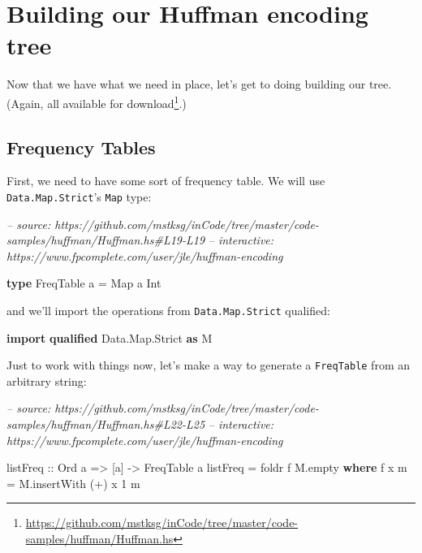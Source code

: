 \documentclass[]{article}
\newenvironment{Shaded}{}{}
\newcommand{\CommentTok}[1]{\textcolor[rgb]{0.38,0.63,0.69}{\textit{#1}}}
\newcommand{\DataTypeTok}[1]{\textcolor[rgb]{0.56,0.13,0.00}{#1}}
\newcommand{\DecValTok}[1]{\textcolor[rgb]{0.25,0.63,0.44}{#1}}
\newcommand{\FunctionTok}[1]{\textcolor[rgb]{0.02,0.16,0.49}{#1}}
\newcommand{\KeywordTok}[1]{\textcolor[rgb]{0.00,0.44,0.13}{\textbf{#1}}}
\newcommand{\NormalTok}[1]{#1}
\newcommand{\OtherTok}[1]{\textcolor[rgb]{0.00,0.44,0.13}{#1}}
\renewcommand{\href}[2]{#2\footnote{\url{#1}}}
\begin{document}
\hypertarget{building-our-huffman-encoding-tree}{%
\section{Building our Huffman encoding
tree}\label{building-our-huffman-encoding-tree}}

Now that we have what we need in place, let's get to doing building our tree.
(Again, all available
\href{https://github.com/mstksg/inCode/tree/master/code-samples/huffman/Huffman.hs}{for
download}.)

\hypertarget{frequency-tables}{%
\subsection{Frequency Tables}\label{frequency-tables}}

First, we need to have some sort of frequency table. We will use
\texttt{Data.Map.Strict}'s \texttt{Map} type:

\begin{Shaded}
\begin{Highlighting}[]
\CommentTok{-- source: https://github.com/mstksg/inCode/tree/master/code-samples/huffman/Huffman.hs#L19-L19}
\CommentTok{-- interactive: https://www.fpcomplete.com/user/jle/huffman-encoding}

\KeywordTok{type} \DataTypeTok{FreqTable}\NormalTok{ a }\FunctionTok{=} \DataTypeTok{Map}\NormalTok{ a }\DataTypeTok{Int}
\end{Highlighting}
\end{Shaded}

and we'll import the operations from \texttt{Data.Map.Strict} qualified:

\begin{Shaded}
\begin{Highlighting}[]
\KeywordTok{import} \KeywordTok{qualified} \DataTypeTok{Data.Map.Strict} \KeywordTok{as} \DataTypeTok{M}
\end{Highlighting}
\end{Shaded}

Just to work with things now, let's make a way to generate a \texttt{FreqTable}
from an arbitrary string:

\begin{Shaded}
\begin{Highlighting}[]
\CommentTok{-- source: https://github.com/mstksg/inCode/tree/master/code-samples/huffman/Huffman.hs#L22-L25}
\CommentTok{-- interactive: https://www.fpcomplete.com/user/jle/huffman-encoding}

\OtherTok{listFreq ::} \DataTypeTok{Ord}\NormalTok{ a }\OtherTok{=>}\NormalTok{ [a] }\OtherTok{->} \DataTypeTok{FreqTable}\NormalTok{ a}
\NormalTok{listFreq }\FunctionTok{=}\NormalTok{ foldr f M.empty}
  \KeywordTok{where}
\NormalTok{    f x m }\FunctionTok{=}\NormalTok{ M.insertWith (}\FunctionTok{+}\NormalTok{) x }\DecValTok{1}\NormalTok{ m}
\end{Highlighting}
\end{Shaded}
\end{document}
